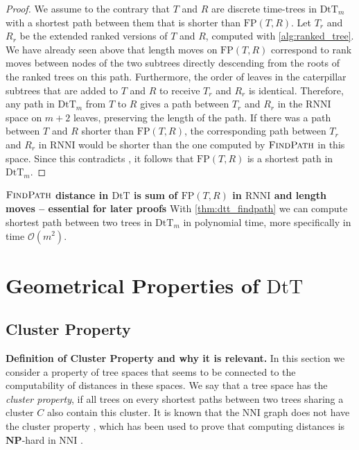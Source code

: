 \documentclass[11pt]{amsart}
\newcommand{\rnni}{\mathrm{RNNI}}
\newcommand{\findpath}{\textsc{FindPath}}
\newcommand{\nni}{\mathrm{NNI}}
\newcommand{\fp}{\mathrm{FP}}
\newcommand{\dtt}{\mathrm{DtT}}
\newcommand{\np}{\mathbf{NP}}
\renewcommand{\O}{\mathcal O}
\newcommand{\summary}[1]{\textbf{#1}} %
\begin{document}
\begin{proof}
	We assume to the contrary that $T$ and $R$ are discrete time-trees in $\dtt_m$ with a shortest path between them that is shorter than $\fp(T,R)$.
	Let $T_r$ and $R_r$ be the extended ranked versions of $T$ and $R$, computed with \autoref{alg:ranked_tree}.
	We have already seen above that length moves on $\fp(T,R)$ correspond to rank moves between nodes of the two subtrees directly descending from the roots of the ranked trees on this path.
	Furthermore, the order of leaves in the caterpillar subtrees that are added to $T$ and $R$ to receive $T_r$ and $R_r$ is identical.
	Therefore, any path in $\dtt_m$ from $T$ to $R$ gives a path between $T_r$ and $R_r$ in the $\rnni$ space on $m+2$ leaves, preserving the length of the path.
	If there was a path between $T$ and $R$ shorter than $\fp(T,R)$, the corresponding path between $T_r$ and $R_r$ in $\rnni$ would be shorter than the one computed by $\findpath$ in this space.
	Since this contradicts \autocite[Theorem 1]{Collienne2020-iu}, it follows that $\fp(T,R)$ is a shortest path in $\dtt_m$.
\end{proof}

\summary{$\findpath$ distance in $\dtt$ is sum of $\fp(T,R)$ in $\rnni$ and length moves -- essential for later proofs}
With \autoref{thm:dtt_findpath} we can compute shortest path between two trees in $\dtt_m$ in polynomial time, more specifically in time $\O(m^2)$.


\section{Geometrical Properties of $\dtt$}

\subsection{Cluster Property}

\summary{Definition of Cluster Property and why it is relevant.}
In this section we consider a property of tree spaces that seems to be connected to the computability of distances in these spaces.
We say that a tree space has the \emph{cluster property}, if all trees on every shortest paths between two trees sharing a cluster $C$ also contain this cluster.
It is known that the $\nni$ graph does not have the cluster property \autocite{Li1996-zw}, which has been used to prove that computing distances is $\np$-hard in $\nni$ \autocite{Dasgupta2000-xa}.
\end{document}
